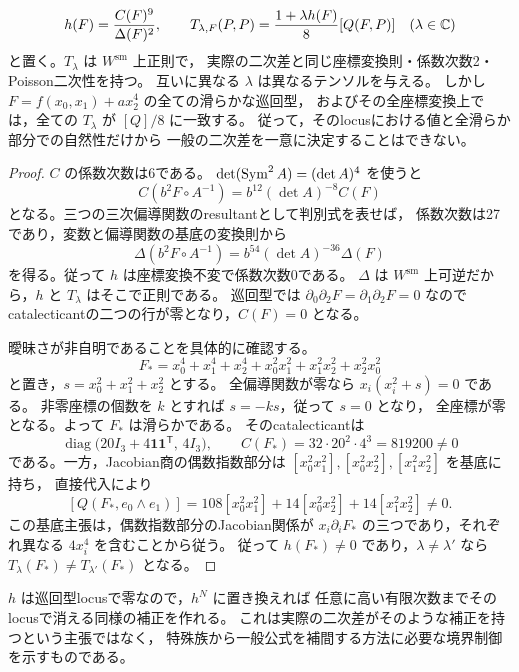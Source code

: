 \begin{proposition}[巡回族で一致する異なる自然テンソル]
\label{prop:ku-catalecticant-ambiguity}
\begin{equation}\label{eq:ku-catalecticant-ambiguity}
 h(F)=\frac{C(F)^9}{\Delta(F)^2},\qquad
 T_{\lambda,F}(P,P)=\frac{1+\lambda h(F)}8[Q(F,P)]
 \quad(\lambda\in\mathbb C)
\end{equation}
と置く。$T_\lambda$ は $W^{\mathrm{sm}}$ 上正則で，
実際の二次差と同じ座標変換則・係数次数2・Poisson二次性を持つ。
互いに異なる $\lambda$ は異なるテンソルを与える。
しかし $F=f(x_0,x_1)+a x_2^4$ の全ての滑らかな巡回型，
およびその全座標変換上では，全ての $T_\lambda$ が $[Q]/8$ に一致する。
従って，そのlocusにおける値と全滑らか部分での自然性だけから
一般の二次差を一意に決定することはできない。
\end{proposition}
\begin{proof}
$C$ の係数次数は6である。
$\det(\operatorname{Sym}^2 A)=(\det A)^4$ を使うと
\[
 C(b^2F\circ A^{-1})=b^{12}(\det A)^{-8}C(F)
\]
となる。三つの三次偏導関数のresultantとして判別式を表せば，
係数次数は27であり，変数と偏導関数の基底の変換則から
\[
 \Delta(b^2F\circ A^{-1})
 =b^{54}(\det A)^{-36}\Delta(F)
\]
を得る。従って $h$ は座標変換不変で係数次数0である。
$\Delta$ は $W^{\mathrm{sm}}$ 上可逆だから，$h$ と $T_\lambda$ はそこで正則である。
巡回型では $\partial_0\partial_2F=\partial_1\partial_2F=0$ なので
catalecticantの二つの行が零となり，$C(F)=0$ となる。

曖昧さが非自明であることを具体的に確認する。
\[
 F_*=x_0^4+x_1^4+x_2^4
      +x_0^2x_1^2+x_1^2x_2^2+x_2^2x_0^2
\]
と置き，$s=x_0^2+x_1^2+x_2^2$ とする。
全偏導関数が零なら $x_i(x_i^2+s)=0$ である。
非零座標の個数を $k$ とすれば $s=-ks$，従って $s=0$ となり，
全座標が零となる。よって $F_*$ は滑らかである。
そのcatalecticantは
\[
 \operatorname{diag}
   \bigl(20I_3+4\mathbf1\mathbf1^{\mathsf T},\,4I_3\bigr),
 \qquad C(F_*)=32\cdot20^2\cdot4^3=819200\ne0
\]
である。一方，Jacobian商の偶数指数部分は
$[x_0^2x_1^2],[x_0^2x_2^2],[x_1^2x_2^2]$ を基底に持ち，
直接代入により
\[
 [Q(F_*,e_0\wedge e_1)]
 =108[x_0^2x_1^2]+14[x_0^2x_2^2]+14[x_1^2x_2^2]\ne0.
\]
この基底主張は，偶数指数部分のJacobian関係が
$x_i\partial_iF_*$ の三つであり，それぞれ異なる $4x_i^4$ を含むことから従う。
従って $h(F_*)\ne0$ であり，$\lambda\ne\lambda'$ なら
$T_\lambda(F_*)\ne T_{\lambda'}(F_*)$ となる。
\end{proof}

\begin{remark}
$h$ は巡回型locusで零なので，$h^N$ に置き換えれば
任意に高い有限次数までそのlocusで消える同様の補正を作れる。
これは実際の二次差がそのような補正を持つという主張ではなく，
特殊族から一般公式を補間する方法に必要な境界制御を示すものである。
\end{remark}

